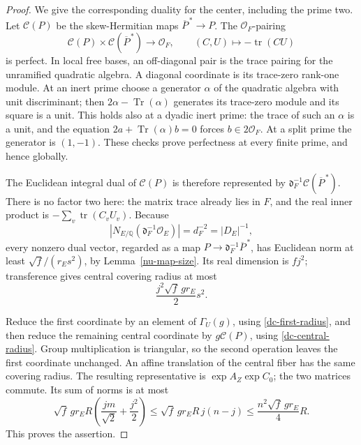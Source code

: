 \begin{proof}
We give the corresponding duality for the center,
including the prime two.  Let \(\mathcal C(P)\) be the
skew-Hermitian maps \(\overline P^{\,*}\to P\).
The \(\mathcal O_F\)-pairing
\[
 \mathcal C(P)\times\mathcal C(\overline P^{\,*})
       \longrightarrow\mathcal O_F,\qquad
                         (C,U)\longmapsto-\operatorname{tr}(CU)
\]
is perfect.  In local free bases, an off-diagonal pair
is the trace pairing for the unramified quadratic
algebra.  A diagonal coordinate is its trace-zero
rank-one module.  At an inert prime choose a generator
\(\alpha\) of the quadratic algebra with unit
discriminant; then
\(2\alpha-\operatorname{Tr}(\alpha)\) generates its
trace-zero module and its square is a unit.
This holds also at a dyadic inert prime: the trace of
such an \(\alpha\) is a unit, and the equation
\(2a+\operatorname{Tr}(\alpha)b=0\) forces
\(b\in2\mathcal O_F\).
At a split prime the generator is \((1,-1)\).
These checks prove perfectness at every finite prime,
and hence globally.

The Euclidean integral dual of \(\mathcal C(P)\) is
therefore represented by
\(\mathfrak d_F^{-1}\mathcal C(\overline P^{\,*})\).
There is no factor two here: the matrix trace already
lies in \(F\), and the real inner product is
\(-\sum_v\operatorname{tr}(C_vU_v)\).
Because
\[
 |N_{E/\mathbb Q}(\mathfrak d_F^{-1}\mathcal O_E)|
                        =d_F^{-2}=|D_E|^{-1},
\]
every nonzero dual vector, regarded as a map
\(P\to\mathfrak d_F^{-1}\overline P^{\,*}\),
has Euclidean norm at least
\(\sqrt f/(r_Es^2)\), by Lemma~\ref{nu-map-size}.
Its real dimension is \(fj^2\); transference gives
central covering radius at most
\begin{equation}\label{dc-central-radius}
                        \frac{j^2\sqrt f\,g r_E}{2}s^2.
\end{equation}

Reduce the first coordinate by an element of
\(\Gamma_U(g)\), using \eqref{dc-first-radius}, and
then reduce the remaining central coordinate by
\(g\mathcal C(P)\), using \eqref{dc-central-radius}.
Group multiplication is triangular, so the second
operation leaves the first coordinate unchanged.
An affine translation of the central fiber has the
same covering radius.  The resulting representative
is \(\exp A_Z\exp C_0\); the two matrices commute.
Its sum of norms is at most
\[
 \sqrt f\,g r_ER\left(\frac{jm}{\sqrt2}+\frac{j^2}{2}\right)
 \le\sqrt f\,g r_ER\,j(n-j)
 \le\frac{n^2\sqrt f\,g r_E}{4}R.
\]
This proves the assertion.
\end{proof}

